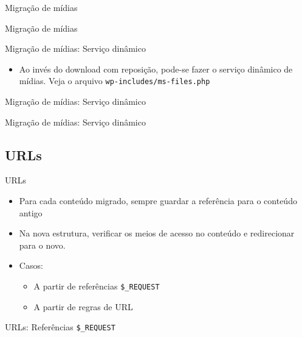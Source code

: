 \documentclass[handout]{beamer}
\begin{document}
\begin{frame}{Migração de mídias}
  
\end{frame}

\begin{frame}{Migração de mídias}
  
\end{frame}

\begin{frame}{Migração de mídias: Serviço dinâmico}
  \begin{itemize}
    \item Ao invés do download com reposição, pode-se fazer o serviço dinâmico
      de mídias. Veja o arquivo \texttt{wp-includes/ms-files.php}
  \end{itemize}
\end{frame}

\begin{frame}{Migração de mídias: Serviço dinâmico}
  
\end{frame}

\begin{frame}{Migração de mídias: Serviço dinâmico}
  
\end{frame}

\subsection{URLs}

\begin{frame}{URLs}
  \begin{itemize}
    \item Para cada conteúdo migrado, sempre guardar a referência
          para o conteúdo antigo
    \pause \item Na nova estrutura, verificar os meios de acesso no conteúdo
           e redirecionar para o novo.
    \pause \item Casos:
    \begin{itemize}
      \item A partir de referências \texttt{\$\_REQUEST}
      \item A partir de regras de URL
    \end{itemize}
  \end{itemize}
\end{frame}

\begin{frame}{URLs: Referências \texttt{\$\_REQUEST}}
  
\end{frame}
\end{document}
